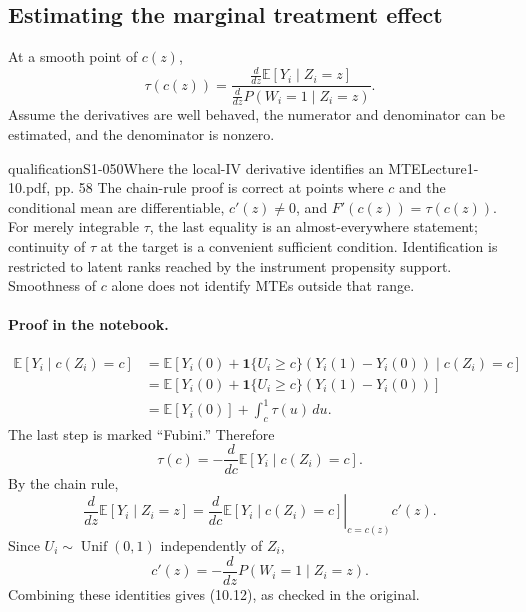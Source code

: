 \subsection{Estimating the marginal treatment effect}
At a smooth point of $c(z)$,
\[
 \tau(c(z))=
 \frac{\displaystyle\frac d{dz}\mathbb E[Y_i\mid Z_i=z]}
 {\displaystyle\frac d{dz}P(W_i=1\mid Z_i=z)}.\tag{10.12}
\]
Assume the derivatives are well behaved, the numerator and denominator can be estimated, and the denominator is nonzero.
\begin{reviewnote}{qualification}{S1-050}{Where the local-IV derivative identifies an MTE}{Lecture1-10.pdf, pp. 58}
The chain-rule proof is correct at points where $c$ and the conditional mean are differentiable, $c'(z)\ne0$, and $F'(c(z))=\tau(c(z))$. For merely integrable $\tau$, the last equality is an almost-everywhere statement; continuity of $\tau$ at the target is a convenient sufficient condition. Identification is restricted to latent ranks reached by the instrument propensity support. Smoothness of $c$ alone does not identify MTEs outside that range.
\end{reviewnote}


\paragraph{Proof in the notebook.}
\begin{align*}
 \mathbb E[Y_i\mid c(Z_i)=c]
 &=\mathbb E[Y_i(0)+\mathbf1\{U_i\ge c\}(Y_i(1)-Y_i(0))
 \mid c(Z_i)=c]\\
 &=\mathbb E[Y_i(0)+\mathbf1\{U_i\ge c\}(Y_i(1)-Y_i(0))]\\
 &=\mathbb E[Y_i(0)]+\int_c^1\tau(u)\,du.
\end{align*}
The last step is marked ``Fubini.'' Therefore
\[
 \tau(c)=-\frac d{dc}\mathbb E[Y_i\mid c(Z_i)=c].
\]
By the chain rule,
\[
 \frac d{dz}\mathbb E[Y_i\mid Z_i=z]
 =\left.\frac d{dc}\mathbb E[Y_i\mid c(Z_i)=c]\right|_{c=c(z)}c'(z).
\]
Since $U_i\sim\operatorname{Unif}(0,1)$ independently of $Z_i$,
\[
 c'(z)=-\frac d{dz}P(W_i=1\mid Z_i=z).
\]
Combining these identities gives (10.12), as checked in the original.
